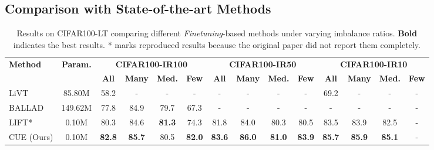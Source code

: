 \subsection{Comparison with State-of-the-art Methods}
\begin{table}[!t]
\centering
\caption{Results on CIFAR100-LT comparing different \textit{Finetuning}-based methods under varying imbalance ratios. \textbf{Bold} indicates the best results. * marks reproduced results because the original paper did not report them completely.}
\label{tab:cifar100}
\footnotesize
\begin{tabular}{l|c|cccc|cccc|cccc}
\toprule
\multirow{2}{*}{\textbf{Method}} & \multirow{2}{*}{\textbf{Param.}} 
& \multicolumn{4}{c|}{\textbf{CIFAR100-IR100}}                                    
& \multicolumn{4}{c|}{\textbf{CIFAR100-IR50}}                                      
& \multicolumn{4}{c}{\textbf{CIFAR100-IR10}}                                    \\
& & \textbf{All} & \textbf{Many} & \textbf{Med.} & \textbf{Few} 
& \textbf{All} & \textbf{Many} & \textbf{Med.} & \textbf{Few} 
& \textbf{All} & \textbf{Many} & \textbf{Med.} & \textbf{Few} \\
\midrule
LiVT~\cite{xu2023learning} & 85.80M 
& 58.2 & - & - & - 
& - & - & - & - 
& 69.2 & - & - & - \\

BALLAD~\cite{ma2021simple} & 149.62M 
& 77.8 & 84.9 & 79.7 & 67.3
& - & - & - & -
& - & - & - & - \\

LIFT*~\cite{shi2024long} & 0.10M 
& 80.3 & 84.6 & \textbf{81.3} & 74.3
& 81.8 & 84.0 & 80.3 & 80.5
& 83.5 & 83.9 & 82.5 & - \\

\midrule
CUE (Ours) & 0.10M 
& \textbf{82.8} & \textbf{85.7} & 80.5 & \textbf{82.0}
& \textbf{83.6} & \textbf{86.0} & \textbf{81.0} & \textbf{83.9}
& \textbf{85.7} & \textbf{85.9} & \textbf{85.1} & - \\
\bottomrule
\end{tabular}
\vspace{-1em}
\end{table}



